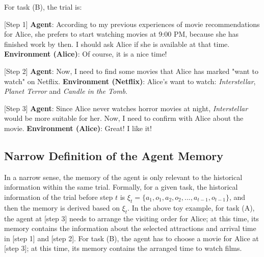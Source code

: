 \documentclass{article}
\theoremstyle{definition}
\theoremstyle{theorem}
\theoremstyle{proof}
\theoremstyle{remark}
\begin{document}
	For task (B), the trial is:
	
	[Step 1] \textbf{Agent}: According to my previous experiences of movie recommendations for Alice, she prefers to start watching movies at 9:00 PM, because she has finished work by then. I should ask Alice if she is available at that time.  \textbf{Environment (Alice)}: Of course, it is a nice time!
	
	[Step 2] \textbf{Agent}: Now, I need to find some movies that Alice has marked "want to watch" on Netflix. \textbf{Environment (Netflix)}: Alice's want to watch: \textit{Interstellar}, \textit{Planet Terror} and \textit{Candle in the Tomb}.
	
	[Step 3] \textbf{Agent}: Since Alice never watches horror movies at night, \textit{Interstellar} would be more suitable for her. Now, I need to confirm with Alice about the movie. \textbf{Environment (Alice)}: Great! I like it!
		
	\subsection{Narrow Definition of the Agent Memory}
	In a narrow sense, the memory of the agent is only relevant to the historical information within the same trial.
	Formally, for a given task, the historical information of the trial before step $t$ is $\xi_t = \{a_1,o_1,a_2,o_2, ..., a_{t-1},o_{t-1}\}$, and then the memory is derived based on $\xi_t$.
	{In the above toy example, for task (A), the agent at [step 3] needs to arrange the visiting order for Alice; at this time, its memory contains the information about the selected attractions and arrival time in [step 1] and [step 2]. For task (B), the agent has to choose a movie for Alice at [step 3]; at this time, its memory contains the arranged time to watch films.}
	
\end{document}
